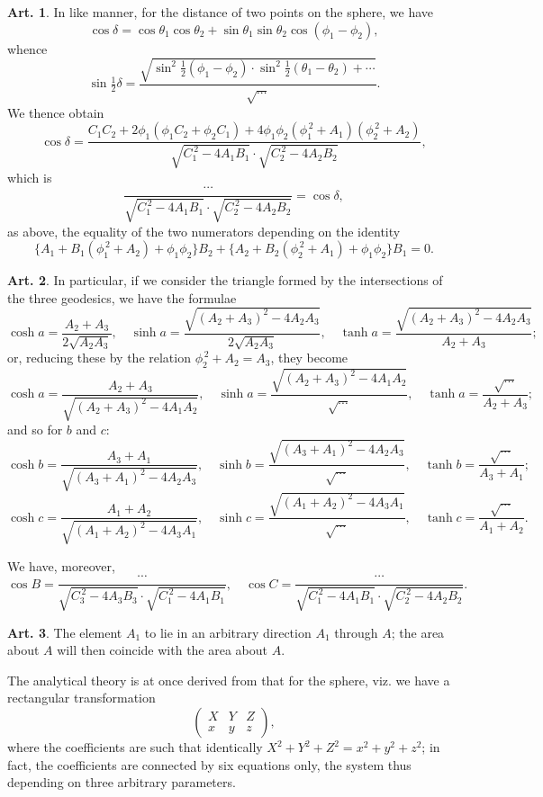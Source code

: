 \documentclass[11pt,a4paper]{article}
\theoremstyle{definition}
\newtheorem{art}{Art.}[section]
\begin{document}
\begin{art}
In like manner, for the distance of two points on the sphere, we have
\[
\cos\delta = \cos\theta_1\cos\theta_2 + \sin\theta_1\sin\theta_2\cos(\phi_1 - \phi_2),
\]
whence
\[
\sin\tfrac{1}{2}\delta = \frac{\sqrt{\sin^2\tfrac{1}{2}(\phi_1-\phi_2) \cdot \sin^2\tfrac{1}{2}(\theta_1-\theta_2) + \cdots}}{\sqrt{\cdots}}.
\]
We thence obtain
\[
\cos\delta = \frac{C_1C_2 + 2\phi_1(\phi_1C_2 + \phi_2C_1) + 4\phi_1\phi_2(\phi_1^{\,2} + A_1)(\phi_2^{\,2} + A_2)}{\sqrt{C_1^{\,2} - 4A_1B_1} \cdot \sqrt{C_2^{\,2} - 4A_2B_2}},
\]
which is
\[
\frac{\cdots}{\sqrt{C_1^{\,2} - 4A_1B_1} \cdot \sqrt{C_2^{\,2} - 4A_2B_2}} = \cos\delta,
\]
as above, the equality of the two numerators depending on the identity
\[
\{A_1 + B_1(\phi_1^{\,2} + A_2) + \phi_1\phi_2\}B_2 + \{A_2 + B_2(\phi_2^{\,2} + A_1) + \phi_1\phi_2\}B_1 = 0.
\]
\end{art}

\begin{art}
In particular, if we consider the triangle formed by the intersections of the three geodesics, we have the formulae
\[
\cosh a = \frac{A_2 + A_3}{2\sqrt{A_2A_3}}, \quad \sinh a = \frac{\sqrt{(A_2+A_3)^2 - 4A_2A_3}}{2\sqrt{A_2A_3}}, \quad \tanh a = \frac{\sqrt{(A_2+A_3)^2 - 4A_2A_3}}{A_2 + A_3};
\]
or, reducing these by the relation $\phi_2^{\,2} + A_2 = A_3$, they become
\[
\cosh a = \frac{A_2 + A_3}{\sqrt{(A_2+A_3)^2 - 4A_1A_2}}, \quad \sinh a = \frac{\sqrt{(A_2+A_3)^2 - 4A_1A_2}}{\sqrt{\cdots}}, \quad \tanh a = \frac{\sqrt{\cdots}}{A_2 + A_3};
\]
and so for $b$ and $c$:
\[
\cosh b = \frac{A_3 + A_1}{\sqrt{(A_3+A_1)^2 - 4A_2A_3}}, \quad \sinh b = \frac{\sqrt{(A_3+A_1)^2 - 4A_2A_3}}{\sqrt{\cdots}}, \quad \tanh b = \frac{\sqrt{\cdots}}{A_3 + A_1};
\]
\[
\cosh c = \frac{A_1 + A_2}{\sqrt{(A_1+A_2)^2 - 4A_3A_1}}, \quad \sinh c = \frac{\sqrt{(A_1+A_2)^2 - 4A_3A_1}}{\sqrt{\cdots}}, \quad \tanh c = \frac{\sqrt{\cdots}}{A_1 + A_2}.
\]

We have, moreover,
\[
\cos B = \frac{\cdots}{\sqrt{C_3^{\,2} - 4A_3B_3} \cdot \sqrt{C_1^{\,2} - 4A_1B_1}}, \quad
\cos C = \frac{\cdots}{\sqrt{C_1^{\,2} - 4A_1B_1} \cdot \sqrt{C_2^{\,2} - 4A_2B_2}}.
\]
\end{art}

\begin{art}
The element $A_1$ to lie in an arbitrary direction $A_1$ through $A$; the area about $A$ will then coincide with the area about $A$.

The analytical theory is at once derived from that for the sphere, viz. we have a rectangular transformation
\[
\begin{pmatrix} X & Y & Z \\ x & y & z \end{pmatrix},
\]
where the coefficients are such that identically $X^2 + Y^2 + Z^2 = x^2 + y^2 + z^2$; in fact, the coefficients are connected by six equations only, the system thus depending on three arbitrary parameters.
\end{art}
\end{document}
